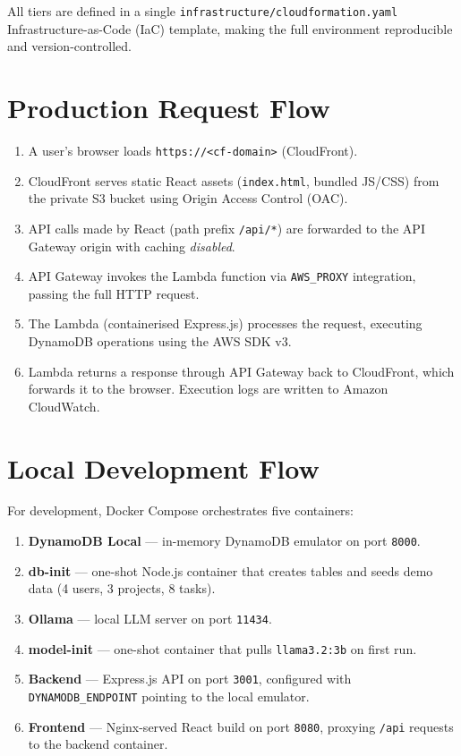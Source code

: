 \documentclass[12pt,a4paper]{report}
\begin{document}
All tiers are defined in a single \texttt{infrastructure/cloudformation.yaml}
Infrastructure-as-Code (IaC) template, making the full environment reproducible and
version-controlled.

\section{Production Request Flow}

\begin{enumerate}
  \item A user's browser loads \texttt{https://<cf-domain>} (CloudFront).
  \item CloudFront serves static React assets (\texttt{index.html}, bundled JS/CSS) from
        the private S3 bucket using Origin Access Control (OAC).
  \item API calls made by React (path prefix \texttt{/api/*}) are forwarded to the API
        Gateway origin with caching \emph{disabled}.
  \item API Gateway invokes the Lambda function via \texttt{AWS\_PROXY} integration,
        passing the full HTTP request.
  \item The Lambda (containerised Express.js) processes the request, executing DynamoDB
        operations using the AWS SDK v3.
  \item Lambda returns a response through API Gateway back to CloudFront, which forwards
        it to the browser. Execution logs are written to Amazon CloudWatch.
\end{enumerate}

\section{Local Development Flow}

For development, Docker Compose orchestrates five containers:

\begin{enumerate}
  \item \textbf{DynamoDB Local} — in-memory DynamoDB emulator on port \texttt{8000}.
  \item \textbf{db-init} — one-shot Node.js container that creates tables and seeds demo
        data (4 users, 3 projects, 8 tasks).
  \item \textbf{Ollama} — local LLM server on port \texttt{11434}.
  \item \textbf{model-init} — one-shot container that pulls \texttt{llama3.2:3b} on
        first run.
  \item \textbf{Backend} — Express.js API on port \texttt{3001}, configured with
        \texttt{DYNAMODB\_ENDPOINT} pointing to the local emulator.
  \item \textbf{Frontend} — Nginx-served React build on port \texttt{8080}, proxying
        \texttt{/api} requests to the backend container.
\end{enumerate}
\end{document}
